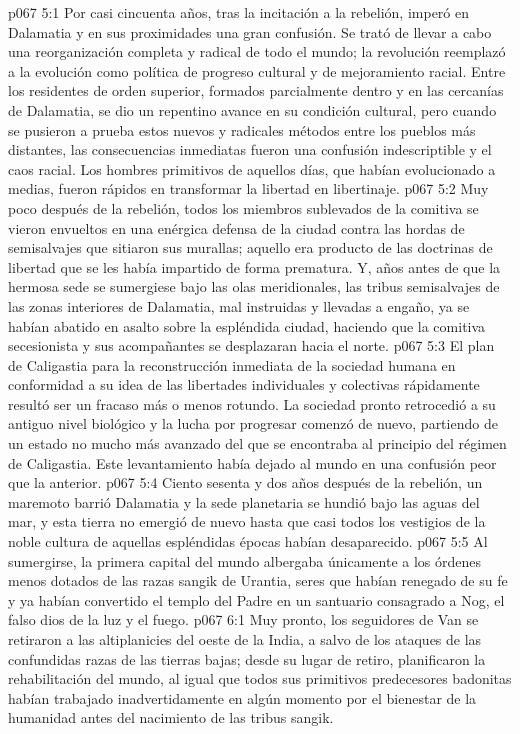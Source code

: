 \vs p067 5:1 Por casi cincuenta años, tras la incitación a la rebelión, imperó en Dalamatia y en sus proximidades una gran confusión. Se trató de llevar a cabo una reorganización completa y radical de todo el mundo; la revolución reemplazó a la evolución como política de progreso cultural y de mejoramiento racial. Entre los residentes de orden superior, formados parcialmente dentro y en las cercanías de Dalamatia, se dio un repentino avance en su condición cultural, pero cuando se pusieron a prueba estos nuevos y radicales métodos entre los pueblos más distantes, las consecuencias inmediatas fueron una confusión indescriptible y el caos racial. Los hombres primitivos de aquellos días, que habían evolucionado a medias, fueron rápidos en transformar la libertad en libertinaje.
\vs p067 5:2 Muy poco después de la rebelión, todos los miembros sublevados de la comitiva se vieron envueltos en una enérgica defensa de la ciudad contra las hordas de semisalvajes que sitiaron sus murallas; aquello era producto de las doctrinas de libertad que se les había impartido de forma prematura. Y, años antes de que la hermosa sede se sumergiese bajo las olas meridionales, las tribus semisalvajes de las zonas interiores de Dalamatia, mal instruidas y llevadas a engaño, ya se habían abatido en asalto sobre la espléndida ciudad, haciendo que la comitiva secesionista y sus acompañantes se desplazaran hacia el norte.
\vs p067 5:3 El plan de Caligastia para la reconstrucción inmediata de la sociedad humana en conformidad a su idea de las libertades individuales y colectivas rápidamente resultó ser un fracaso más o menos rotundo. La sociedad pronto retrocedió a su antiguo nivel biológico y la lucha por progresar comenzó de nuevo, partiendo de un estado no mucho más avanzado del que se encontraba al principio del régimen de Caligastia. Este levantamiento había dejado al mundo en una confusión peor que la anterior.
\vs p067 5:4 \pc Ciento sesenta y dos años después de la rebelión, un maremoto barrió Dalamatia y la sede planetaria se hundió bajo las aguas del mar, y esta tierra no emergió de nuevo hasta que casi todos los vestigios de la noble cultura de aquellas espléndidas épocas habían desaparecido.
\vs p067 5:5 Al sumergirse, la primera capital del mundo albergaba únicamente a los órdenes menos dotados de las razas sangik de Urantia, seres que habían renegado de su fe y ya habían convertido el templo del Padre en un santuario consagrado a Nog, el falso dios de la luz y el fuego.
\vs p067 6:1 Muy pronto, los seguidores de Van se retiraron a las altiplanicies del oeste de la India, a salvo de los ataques de las confundidas razas de las tierras bajas; desde su lugar de retiro, planificaron la rehabilitación del mundo, al igual que todos sus primitivos predecesores badonitas habían trabajado inadvertidamente en algún momento por el bienestar de la humanidad antes del nacimiento de las tribus sangik.
